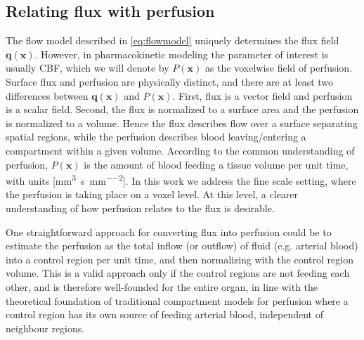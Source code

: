 \documentclass[aps,prb,article,groupedaddress,showkeys]{revtex4}
\begin{document}

	\subsection{Relating flux with perfusion}\label{sec:flux2perf}
	The flow model described in \eqref{eq:flowmodel} uniquely determines the flux field $\mathbf{q}(\mathbf{x})$. 
	However, in pharmacokinetic modeling the parameter of interest is usually CBF, which we will denote by $P (\mathbf{x})$ as the voxelwise field of perfusion. Surface flux and perfusion are physically distinct, and there are at least two differences between $\mathbf{q}(\mathbf{x})$ and $P (\mathbf{x})$. 
	First, flux is a vector field and perfusion is a scalar field. Second, the flux is normalized to a surface area and the perfusion is normalized to a volume. 
	Hence the flux describes flow over a surface separating spatial regions, while the perfusion describes blood leaving/entering a compartment within a given volume. 	
According to the common understanding of perfusion,
	 $P (\mathbf{x})$ is the amount of blood feeding a tissue volume per unit time, with units [\si{\milli\meter\cubed\per\second\per\milli\meter\squared}]. 
	 In this work we address the  fine scale setting, where the perfusion is taking place on a voxel level. At this level, a clearer understanding of how perfusion relates to the flux is desirable.  

	One straightforward approach for converting flux into perfusion could be to estimate the perfusion as the total inflow (or outflow) of fluid (e.g. arterial blood) into a control region per unit time, and then normalizing with the control region volume. 
	This is a valid approach only if the control regions are not feeding each other, and is therefore well-founded for the entire organ,
	in line with the theoretical foundation of traditional compartment models for perfusion where a control region has its own source of feeding arterial blood, independent of neighbour regions. 
\end{document}
